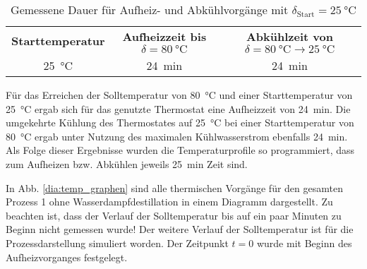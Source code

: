 \begin{table}[h!]
	\renewcommand*{\arraystretch}{1.2}
	\centering
	\caption[Gemessene Dauer für Aufheiz- und Abkühlvorgänge]{Gemessene Dauer für Aufheiz- und Abkühlvorgänge mit $\delta_{\text{Start}}=\SI{25}{\celsius}$}
	\label{tab:zeiten}
	\begin{tabulary}{1.1\textwidth}{C|C|C}
		\hline
		\textbf{Starttemperatur}&\textbf{Aufheizzeit bis $\delta=\SI{80}{\celsius}$} & \textbf{Abkühlzeit von $\delta=\SI{80}{\celsius}\rightarrow\SI{25}{\celsius}$}\\
		\SI{25}{\celsius} & \SI{24}{\minute} & \SI{24}{\minute}\\
		\hline			
	\end{tabulary}
\end{table}%
\FloatBarrier
Für das Erreichen der Solltemperatur von \SI{80}{\celsius} und einer Starttemperatur von \SI{25}{\celsius} ergab sich für das genutzte Thermostat eine Aufheizzeit von \SI{24}{\minute}. Die umgekehrte Kühlung des Thermostates auf \SI{25}{\celsius} bei einer Starttemperatur von \SI{80}{\celsius} ergab unter Nutzung des maximalen Kühlwasserstrom ebenfalls \SI{24}{\minute}. \\
Als Folge dieser Ergebnisse wurden die Temperaturprofile so programmiert, dass zum Aufheizen bzw. Abkühlen jeweils \SI{25}{\minute} Zeit sind. 

In Abb. \ref{dia:temp_graphen} sind alle thermischen Vorgänge für den gesamten Prozess 1 ohne Wasserdampfdestillation in einem Diagramm dargestellt.
Zu beachten ist, dass der Verlauf der Solltemperatur bis auf ein paar Minuten zu Beginn nicht gemessen wurde! Der weitere Verlauf der Solltemperatur ist für die Prozessdarstellung simuliert worden. Der Zeitpunkt $t=0$ wurde mit Beginn des Aufheizvorganges festgelegt.

